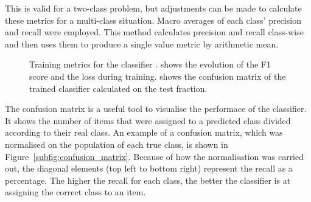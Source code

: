 This is valid for a two-class problem, but adjustments can be made to calculate these metrics for a multi-class situation. Macro averages of each class' precision and recall were employed. This method calculates precision and recall class-wise and then uses them to produce a single value metric by arithmetic mean.

\begin{figure}
    \centering
    \caption[Training metrics for the classifier.]{Training metrics for the classifier \cite{Brugnolotto2024}.  shows the evolution of the F1 score and the loss during training.  shows the confusion matrix of the trained classifier calculated on the test fraction.}
    \label{fig:training_metrics}
\end{figure}

The confusion matrix is a useful tool to visualise the performace of the classifier. It shows the number of items that were assigned to a predicted class divided according to their real class. An example of a confusion matrix, which was normalised on the population of each true class, is shown in Figure~\ref{subfig:confusion_matrix}. Because of how the normalisation was carried out, the diagonal elements (top left to bottom right) represent the recall as a percentage. The higher the recall for each class, the better the classifier is at assigning the correct class to an item. 

